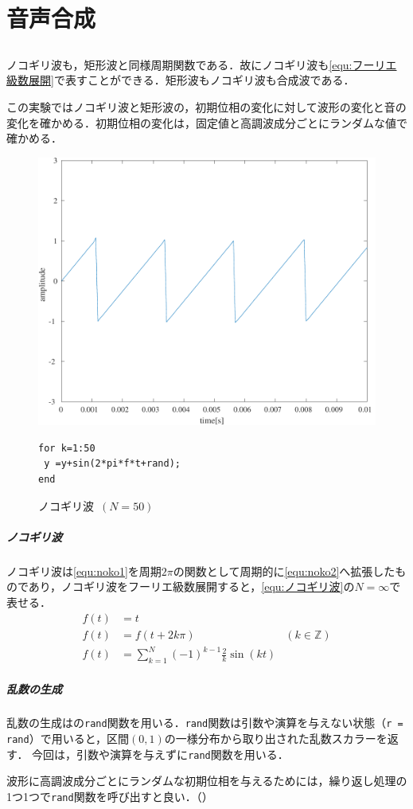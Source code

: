 \chapter{音声合成}
\section{\kadaica}\label{sec:\kadaica}
\purpose
ノコギリ波も，矩形波と同様周期関数である．故にノコギリ波も\eqref{equ:フーリエ級数展開}で表すことができる．矩形波もノコギリ波も合成波である．\par
この実験ではノコギリ波と矩形波の，初期位相の変化に対して波形の変化と音の変化を確かめる．初期位相の変化は，固定値と高調波成分ごとにランダムな値で確かめる．

\begin{figure}
    \centering
    \includegraphics[keepaspectratio,width=.3\textwidth]{../../Figures/03_11_nokogiri.pdf}
    \caption{ノコギリ波\ \((N=50)\)}
    \label{fig:ノコギリ波}
    \begin{lstlisting}[caption={ランダム初期位相},label={src:ランダム初期位相},numbers={none}]
for k=1:50
 y =y+sin(2*pi*f*t+rand);
end    
    \end{lstlisting}
    \vspace{-2cm}
\end{figure}
\method
\paragraph{ノコギリ波}ノコギリ波は\eqref{equ:noko1}を周期\(2\pi\)の関数として周期的に\eqref{equ:noko2}へ拡張したものであり，ノコギリ波をフーリエ級数展開すると，\eqref{equ:ノコギリ波}の\(N=\infty\)で表せる．
\begin{align}
    f(t) & =t\label{equ:noko1}                                                                               \\
    f(t) & =f(t+2k\pi)                                                   & (k\in\mathbb{Z})\label{equ:noko2} \\
    f(t) & =\sum_{k=1}^{N}(-1)^{k-1}\frac{2}{k}\sin(kt)\label{equ:ノコギリ波}
\end{align}
\paragraph{乱数の生成}乱数の生成は\matlab の\texttt{rand}関数を用いる．\texttt{rand}関数は引数や演算を与えない状態（\texttt{r = rand}）で用いると，区間\((0,1)\)の一様分布から取り出された乱数スカラーを返す\cite{matlab_rand}．
今回は，引数や演算を与えずに\texttt{rand}関数を用いる．\par
波形に高調波成分ごとにランダムな初期位相を与えるためには，繰り返し処理の1つ1つで\texttt{rand}関数を呼び出すと良い．（）
